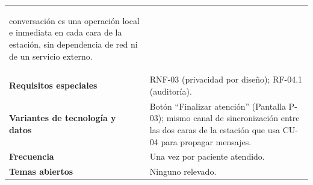 \begin{longtable}{@{}>{\raggedright\arraybackslash}p{4.1cm} >{\raggedright\arraybackslash}p{\dimexpr\textwidth-4.1cm-2\tabcolsep\relax}@{}}
\begin{itemize}[leftmargin=*, itemsep=2pt]
    conversación es una operación local e inmediata en cada cara de la
    estación, sin dependencia de red ni de un servicio externo.
\end{itemize} \\
\textbf{Requisitos especiales} & RNF-03 (privacidad por diseño); RF-04.1 (auditoría). \\
\textbf{Variantes de tecnología y datos} &
Botón ``Finalizar atención'' (Pantalla P-03); mismo canal de
sincronización entre las dos caras de la estación que usa CU-04 para
propagar mensajes. \\
\textbf{Frecuencia} & Una vez por paciente atendido. \\
\textbf{Temas abiertos} & Ninguno relevado. \\
\bottomrule
\end{longtable}
